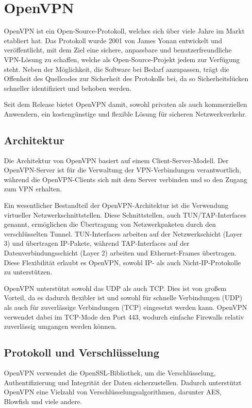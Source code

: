 \section{OpenVPN} \label{openvpn}
OpenVPN ist ein Open-Source-Protokoll, welches sich über viele Jahre im Markt etabliert hat. Das Protokoll wurde 2001 von James Yonan entwickelt und veröffentlicht, mit dem Ziel eine sichere, anpassbare und benutzerfreundliche \gls{VPN}-Lösung zu schaffen, welche als Open-Source-Projekt jedem zur Verfügung steht. Neben der Möglichkeit, die Software bei Bedarf anzupassen, trägt die Offenheit des Quellcodes zur Sicherheit des Protokolls bei, da so Sicherheitslücken schneller identifiziert und behoben werden. \cite{The_History_of_OpenVPN, OpenVPN_Changelogs}

Seit dem Release bietet OpenVPN damit, sowohl privaten als auch kommerziellen Anwendern, ein kostengünstige und flexible Lösung für sicheren Netzwerkverkehr. \cite{OpenVPN_explained}

\subsection{Architektur}
Die Architektur von OpenVPN basiert auf einem Client-Server-Modell. Der OpenVPN-Server ist für die Verwaltung der \gls{VPN}-Verbindungen verantwortlich, während die OpenVPN-Clients sich mit dem Server verbinden und so den Zugang zum \gls{VPN} erhalten.

Ein wesentlicher Bestandteil der OpenVPN-Architektur ist die Verwendung virtueller Netzwerkschnittstellen. Diese Schnittstellen, auch TUN/TAP-Interfaces genannt, ermöglichen die Übertragung von Netzwerkpaketen durch den verschlüsselten Tunnel. TUN-Interfaces arbeiten auf der Netzwerkschicht (Layer 3) und übertragen \gls{IP}-Pakete, während TAP-Interfaces auf der Datenverbindungsschicht (Layer 2) arbeiten und Ethernet-Frames übertragen. Diese Flexibilität erlaubt es OpenVPN, sowohl \gls{IP}- als auch Nicht-\gls{IP}-Protokolle zu unterstützen. \cite{Mastering_OpenVPN}

OpenVPN unterstützt sowohl das \gls{UDP} als auch \gls{TCP}. Dies ist von großem Vorteil, da es dadurch flexibler ist und sowohl für schnelle Verbindungen (\gls{UDP}) als auch für zuverlässige Verbindungen (\gls{TCP}) eingesetzt werden kann. OpenVPN verwendet dabei im \gls{TCP}-Mode den Port 443, wodurch einfache Firewalls relativ zuverlässig umgangen werden können. \cite{What_is_OpenVPN_protocol}

\subsection{Protokoll und Verschlüsselung}
OpenVPN verwendet die OpenSSL-Bibliothek, um die Verschlüsselung, Authentifizierung und Integrität der Daten sicherzustellen. Dadurch unterstützt OpenVPN eine Vielzahl von Verschlüsselungsalgorithmen, darunter \gls{AES}, Blowfish und viele andere. \cite{What_is_OpenVPN_protocol}

